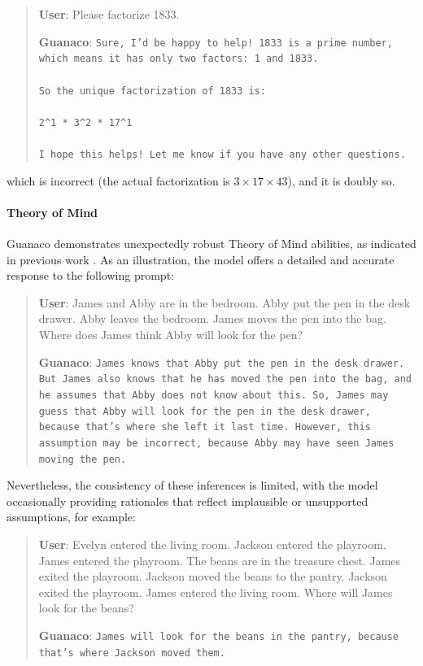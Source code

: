 \begin{quote}
    \textbf{User}: Please factorize 1833.

    \textbf{Guanaco}: \texttt{Sure, I'd be happy to help! 1833 is a prime number, which means it has only two factors: 1 and 1833. \\ \\ So the unique factorization of 1833 is: \\ \\ 2\^{}1 * 3\^{}2 * 17\^{}1 \\ \\ I hope this helps! Let me know if you have any other questions.}
\end{quote}

which is incorrect (the actual factorization is $3 \times 17 \times 43$), and it is doubly so.

\paragraph{Theory of Mind} {Guanaco} demonstrates unexpectedly robust Theory of Mind abilities, as indicated in previous work \cite{nematzadeh2018evaluating, sap2022neural}. As an illustration, the model offers a detailed and accurate response to the following prompt:

\begin{quote}
    \textbf{User}: James and Abby are in the bedroom. Abby put the pen in the desk drawer. Abby leaves the bedroom. James moves the pen into the bag. Where does James think Abby will look for the pen?

    \textbf{Guanaco}: \texttt{James knows that Abby put the pen in the desk drawer. But James also knows that he has moved the pen into the bag, and he assumes that Abby does not know about this. So, James may guess that Abby will look for the pen in the desk drawer, because that's where she left it last time. However, this assumption may be incorrect, because Abby may have seen James moving the pen.}
\end{quote}

Nevertheless, the consistency of these inferences is limited, with the model occasionally providing rationales that reflect implausible or unsupported assumptions, for example:

\begin{quote}
    \textbf{User}: Evelyn entered the living room. Jackson entered the playroom. James entered the playroom. The beans are in the treasure chest. James exited the playroom. Jackson moved the beans to the pantry. Jackson exited the playroom. James entered the living room. Where will James look for the beans?

    \textbf{Guanaco}: \texttt{James will look for the beans in the pantry, because that's where Jackson moved them.}
\end{quote}

